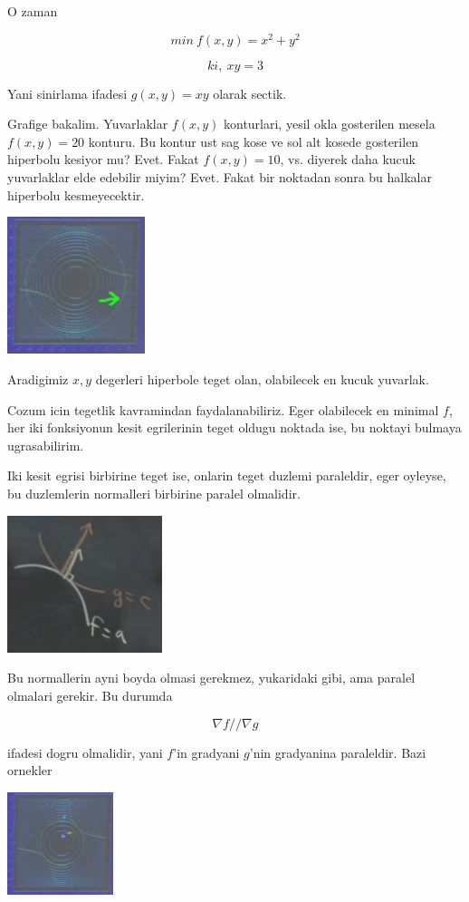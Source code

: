 \documentclass[12pt,fleqn]{article}
\begin{document}
O zaman

\[ min \ f(x,y) = x^2 + y^2 \]

\[ ki, \ xy = 3  \]

Yani sinirlama ifadesi $g(x,y) = xy$ olarak sectik. 

Grafige bakalim. Yuvarlaklar $f(x,y)$ konturlari, yesil okla gosterilen
mesela $f(x,y) = 20$ konturu. Bu kontur ust sag kose ve sol alt kosede
gosterilen hiperbolu kesiyor mu? Evet. Fakat $f(x,y) = 10$, vs. diyerek
daha kucuk yuvarlaklar elde edebilir miyim? Evet. Fakat bir noktadan sonra
bu halkalar hiperbolu kesmeyecektir. 

\includegraphics[height=4cm]{13_2.png}

Aradigimiz $x,y$ degerleri hiperbole teget olan, olabilecek en kucuk
yuvarlak.

Cozum icin tegetlik kavramindan faydalanabiliriz. Eger olabilecek en
minimal $f$, her iki fonksiyonun kesit egrilerinin teget oldugu noktada
ise, bu noktayi bulmaya ugrasabilirim. 

Iki kesit egrisi birbirine teget ise, onlarin teget duzlemi paraleldir,
eger oyleyse, bu duzlemlerin normalleri birbirine paralel olmalidir. 

\includegraphics[height=4cm]{13_3.png}

Bu normallerin ayni boyda olmasi gerekmez, yukaridaki gibi, ama paralel
olmalari gerekir. Bu durumda 

\[ \nabla f // \nabla g \]

ifadesi dogru olmalidir, yani $f$'in gradyani $g$'nin gradyanina
paraleldir. Bazi ornekler

\includegraphics[height=3cm]{13_4.png}
\end{document}
